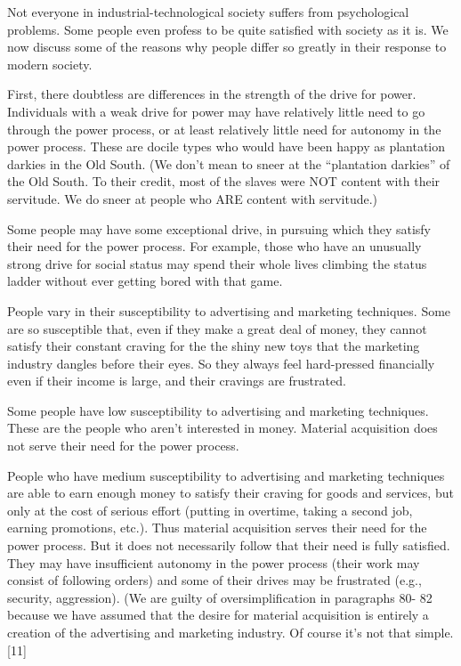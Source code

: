  Not everyone in industrial-technological society suffers from psychological problems. Some people even profess to be quite satisfied with society as it is. We now discuss some of the reasons why people differ so greatly in their response to modern society.

 First, there doubtless are differences in the strength of the drive for power. Individuals with a weak drive for power may have relatively little need to go through the power process, or at least relatively little need for autonomy in the power process. These are docile types who would have been happy as plantation darkies in the Old South. (We don’t mean to sneer at the “plantation darkies” of the Old South. To their credit, most of the slaves were NOT content with their servitude. We do sneer at people who ARE content with servitude.)

 Some people may have some exceptional drive, in pursuing which they satisfy their need for the power process. For example, those who have an unusually strong drive for social status may spend their whole lives climbing the status ladder without ever getting bored with that game.

 People vary in their susceptibility to advertising and marketing techniques. Some are so susceptible that, even if they make a great deal of money, they cannot satisfy their constant craving for the the shiny new toys that the marketing industry dangles before their eyes. So they always feel hard-pressed financially even if their income is large, and their cravings are frustrated.

 Some people have low susceptibility to advertising and marketing techniques. These are the people who aren’t interested in money. Material acquisition does not serve their need for the power process.

 People who have medium susceptibility to advertising and marketing techniques are able to earn enough money to satisfy their craving for goods and services, but only at the cost of serious effort (putting in overtime, taking a second job, earning promotions, etc.). Thus material acquisition serves their need for the power process. But it does not necessarily follow that their need is fully satisfied. They may have insufficient autonomy in the power process (their work may consist of following orders) and some of their drives may be frustrated (e.g., security, aggression). (We are guilty of oversimplification in paragraphs 80- 82 because we have assumed that the desire for material acquisition is entirely a creation of the advertising and marketing industry. Of course it’s not that simple. [11]

